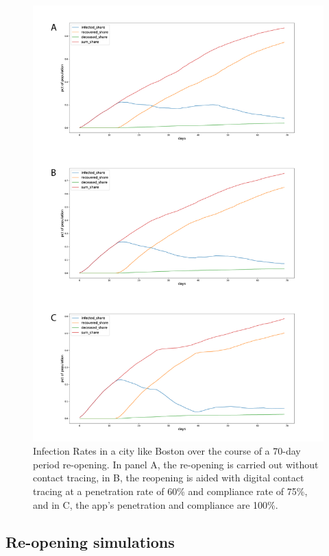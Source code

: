 \documentclass{article}
\begin{document}
\begin{figure} %
  \centering
  \includegraphics[scale=0.25]{Figure-3.png}
  \caption{Infection Rates in a city like Boston over the course of a 70-day period re-opening. In panel A, the re-opening is carried out without contact tracing, in B, the reopening is aided with digital contact tracing at a penetration rate of 60\% and compliance rate of 75\%, and in C, the app's penetration and compliance are 100\%.}
  \label{fig:fig3}
\end{figure}

\subsection{Re-opening simulations}
\end{document}
